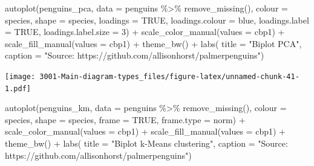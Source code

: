 \documentclass[
]{book}
\newenvironment{Shaded}{\begin{snugshade}}{\end{snugshade}}
\newcommand{\AttributeTok}[1]{\textcolor[rgb]{0.77,0.63,0.00}{#1}}
\newcommand{\ConstantTok}[1]{\textcolor[rgb]{0.00,0.00,0.00}{#1}}
\newcommand{\DecValTok}[1]{\textcolor[rgb]{0.00,0.00,0.81}{#1}}
\newcommand{\FunctionTok}[1]{\textcolor[rgb]{0.00,0.00,0.00}{#1}}
\newcommand{\NormalTok}[1]{#1}
\newcommand{\SpecialCharTok}[1]{\textcolor[rgb]{0.00,0.00,0.00}{#1}}
\newcommand{\StringTok}[1]{\textcolor[rgb]{0.31,0.60,0.02}{#1}}
\begin{document}
\begin{Shaded}
\begin{Highlighting}[]
\FunctionTok{autoplot}\NormalTok{(penguins\_pca, }
                \AttributeTok{data =}\NormalTok{ penguins }\SpecialCharTok{\%\textgreater{}\%} \FunctionTok{remove\_missing}\NormalTok{(), }
                \AttributeTok{colour =} \StringTok{\textquotesingle{}species\textquotesingle{}}\NormalTok{,}
                \AttributeTok{shape =} \StringTok{\textquotesingle{}species\textquotesingle{}}\NormalTok{,}
                \AttributeTok{loadings =} \ConstantTok{TRUE}\NormalTok{, }
                \AttributeTok{loadings.colour =} \StringTok{\textquotesingle{}blue\textquotesingle{}}\NormalTok{,}
                \AttributeTok{loadings.label =} \ConstantTok{TRUE}\NormalTok{, }
                \AttributeTok{loadings.label.size =} \DecValTok{3}\NormalTok{) }\SpecialCharTok{+}
      \FunctionTok{scale\_color\_manual}\NormalTok{(}\AttributeTok{values =}\NormalTok{ cbp1) }\SpecialCharTok{+}
  \FunctionTok{scale\_fill\_manual}\NormalTok{(}\AttributeTok{values =}\NormalTok{ cbp1) }\SpecialCharTok{+}
  \FunctionTok{theme\_bw}\NormalTok{() }\SpecialCharTok{+}
            \FunctionTok{labs}\NormalTok{(}
            \AttributeTok{title =} \StringTok{"Biplot PCA"}\NormalTok{, }
            \AttributeTok{caption =} \StringTok{"Source: https://github.com/allisonhorst/palmerpenguins"}\NormalTok{)}
\end{Highlighting}
\end{Shaded}

\texttt{[image: 3001-Main-diagram-types\_files/figure-latex/unnamed-chunk-41-1.pdf]}

\begin{Shaded}
\begin{Highlighting}[]
\FunctionTok{autoplot}\NormalTok{(penguins\_km, }
                \AttributeTok{data =}\NormalTok{ penguins }\SpecialCharTok{\%\textgreater{}\%} \FunctionTok{remove\_missing}\NormalTok{(), }
                \AttributeTok{colour =} \StringTok{\textquotesingle{}species\textquotesingle{}}\NormalTok{,}
                \AttributeTok{shape =} \StringTok{\textquotesingle{}species\textquotesingle{}}\NormalTok{,}
                \AttributeTok{frame =} \ConstantTok{TRUE}\NormalTok{, }\AttributeTok{frame.type =} \StringTok{\textquotesingle{}norm\textquotesingle{}}\NormalTok{) }\SpecialCharTok{+}
      \FunctionTok{scale\_color\_manual}\NormalTok{(}\AttributeTok{values =}\NormalTok{ cbp1) }\SpecialCharTok{+}
  \FunctionTok{scale\_fill\_manual}\NormalTok{(}\AttributeTok{values =}\NormalTok{ cbp1) }\SpecialCharTok{+}
  \FunctionTok{theme\_bw}\NormalTok{() }\SpecialCharTok{+}
            \FunctionTok{labs}\NormalTok{(}
            \AttributeTok{title =} \StringTok{"Biplot k{-}Means clustering"}\NormalTok{, }
            \AttributeTok{caption =} \StringTok{"Source: https://github.com/allisonhorst/palmerpenguins"}\NormalTok{)}
\end{Highlighting}
\end{Shaded}
\end{document}
